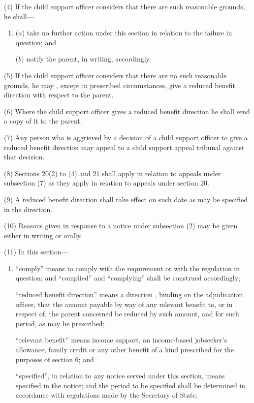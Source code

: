 \documentclass[12pt,a4paper]{article}
\begin{document}
(4) If 
the child support officer 
considers that there are such reasonable grounds, he shall—
\begin{enumerate}\item[]
($a$) take no further action under this section in relation to the failure in question; and

($b$) notify the parent, in writing, accordingly.
\end{enumerate}

(5) If 
the child support officer 
considers that there are no such reasonable grounds, he may%
, except in prescribed circumstances,  %
give a reduced benefit direction with respect to the parent.

(6) Where 
the child support officer 
gives a reduced benefit direction he shall send a copy of it to the parent.

(7) Any person who is aggrieved by a decision of a child support officer to give a reduced benefit direction may appeal to a child support appeal tribunal against that decision.

(8) Sections 20(2)  to (4)  and 21 shall apply in relation to appeals under subsection (7)  as they apply in relation to appeals under section 20.


(9) A reduced benefit direction shall take effect on such date as may be specified in the direction.

(10) Reasons given in response to a notice under subsection (2)  may be given either in writing or orally.

(11) In this section—
\begin{enumerate}\item[]
    “comply” means to comply with the requirement or with the regulation in question; and “complied” and “complying” shall be construed accordingly;

    “reduced benefit direction” means a direction%
, binding on the adjudication officer,  %
that the amount payable by way of any relevant benefit to, or in respect of, the parent concerned be reduced by such amount, and for such period, as may be prescribed;

    “relevant benefit” means income support, 
an income-based jobseeker’s allowance,  %
family credit or any other benefit of a kind prescribed for the purposes of section 6; and

    “specified”, in relation to any notice served under this section, means specified in the notice; and the period to be specified shall be determined in accordance with regulations made by the Secretary of State. 
\end{enumerate}
\end{document}
